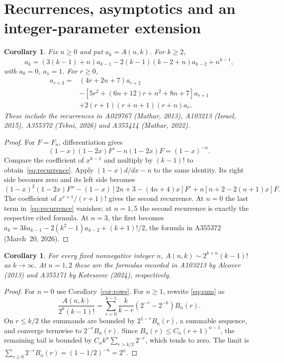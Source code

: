 \documentclass[11pt]{article}
\newtheorem{corollary}[theorem]{Corollary}
\begin{document}
\section{Recurrences, asymptotics and an integer-parameter extension}
\begin{corollary}\label{cor:recurrence}
Fix $n\geq0$ and put $a_k=A(n,k)$. For $k\geq2$,
\begin{equation}\label{eq:recurrence}
 a_k=(3(k-1)+n)a_{k-1}
 -2(k-1)(k-2+n)a_{k-2}+n^{\overline{k-1}},
\end{equation}
with $a_0=0$, $a_1=1$. For $r\geq0$,
\begin{align*}
 a_{r+3}={}&(4r+2n+7)a_{r+2}\\
 &-[5r^2+(6n+12)r+n^2+8n+7]a_{r+1}\\
 &+2(r+1)(r+n+1)(r+n)a_r.
\end{align*}
These include the recurrences in A029767 (Mathar, 2013),
A103213 (Israel, 2015), A355372 (Tebni, 2026)
and A355414 (Mathar, 2022).
\end{corollary}
\begin{proof}
For $F=F_n$, differentiation gives
\[
 (1-x)(1-2x)F'-n(1-2x)F=(1-x)^{-n}.
\]
Compare the coefficient of $x^{k-1}$ and multiply by $(k-1)!$
to obtain~\eqref{eq:recurrence}. Apply $(1-x)d/dx-n$ to the
same identity. Its right side becomes zero and its left side becomes
\[
 (1-x)^2(1-2x)F''
 -(1-x)[2n+3-(4n+4)x]F'
 +n[n+2-2(n+1)x]F.
\]
The coefficient of $x^{r+1}/(r+1)!$ gives the second recurrence.
At $n=0$ the last term in~\eqref{eq:recurrence} vanishes;
at $n=1,5$ the second recurrence is exactly the respective cited formula.
At $n=3$, the first becomes
$a_k=3k a_{k-1}-2(k^2-1)a_{k-2}+(k+1)!/2$,
the formula in A355372 (March~20, 2026).
\end{proof}

\begin{corollary}\label{cor:asymptotic}
For every fixed nonnegative integer $n$,
$A(n,k)\sim2^{k+n}(k-1)!$ as $k\to\infty$.
At $n=1,2$ these are the formulas recorded in A103213 by Alcover (2013)
and A355171 by Kotesovec (2024), respectively.
\end{corollary}
\begin{proof}
For $n=0$ use Corollary~\ref{cor:rows}. For $n\geq1$, rewrite
\eqref{eq:sum} as
\[
 \frac{A(n,k)}{2^k(k-1)!}
 =\sum_{r=0}^{k-1}\frac{k}{k-r}(2^{-r}-2^{-k})B_n(r).
\]
On $r\leq k/2$ the summands are bounded by $2^{1-r}B_n(r)$,
a summable sequence, and converge termwise to $2^{-r}B_n(r)$.
Since $B_n(r)\leq C_n(r+1)^{n-1}$, the remaining tail is bounded
by $C_n k^n\sum_{r>k/2}2^{-r}$, which tends to zero.
The limit is $\sum_{r\geq0}2^{-r}B_n(r)=(1-1/2)^{-n}=2^n$.
\end{proof}
\end{document}
